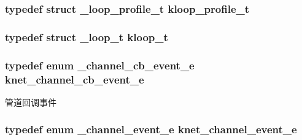 \subsubsection[{kloop\+\_\+profile\+\_\+t}]{\setlength{\rightskip}{0pt plus 5cm}typedef struct {\bf \+\_\+loop\+\_\+profile\+\_\+t} {\bf kloop\+\_\+profile\+\_\+t}}\label{a00054_ab75a5c23099a6118c469ed160b277f28_ab75a5c23099a6118c469ed160b277f28}
\hypertarget{a00054_a97fc76209a58362019f1ded9169e397f_a97fc76209a58362019f1ded9169e397f}{}
\subsubsection[{kloop\+\_\+t}]{\setlength{\rightskip}{0pt plus 5cm}typedef struct {\bf \+\_\+loop\+\_\+t} {\bf kloop\+\_\+t}}\label{a00054_a97fc76209a58362019f1ded9169e397f_a97fc76209a58362019f1ded9169e397f}
\hypertarget{a00054_a2fd2faf971268f5b682ab375c455f7c9_a2fd2faf971268f5b682ab375c455f7c9}{}
\subsubsection[{knet\+\_\+channel\+\_\+cb\+\_\+event\+\_\+e}]{\setlength{\rightskip}{0pt plus 5cm}typedef enum {\bf \+\_\+channel\+\_\+cb\+\_\+event\+\_\+e}  {\bf knet\+\_\+channel\+\_\+cb\+\_\+event\+\_\+e}}\label{a00054_a2fd2faf971268f5b682ab375c455f7c9_a2fd2faf971268f5b682ab375c455f7c9}
管道回调事件 \hypertarget{a00054_accd62b4c787cfb91e81aa14210302863_accd62b4c787cfb91e81aa14210302863}{}
\subsubsection[{knet\+\_\+channel\+\_\+event\+\_\+e}]{\setlength{\rightskip}{0pt plus 5cm}typedef enum {\bf \+\_\+channel\+\_\+event\+\_\+e}  {\bf knet\+\_\+channel\+\_\+event\+\_\+e}}\label{a00054_accd62b4c787cfb91e81aa14210302863_accd62b4c787cfb91e81aa14210302863}
\hypertarget{a00054_a8a7d96123ef4565c6d08fe58a10476a9_a8a7d96123ef4565c6d08fe58a10476a9}{}
